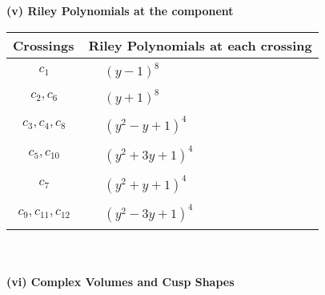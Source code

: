 \documentclass[1p]{elsarticle_modified}
\theoremstyle{definition}
\begin{document}
\newpage\renewcommand{\arraystretch}{1}
\flushleft \textbf{(v) Riley Polynomials at the component}\newline \\
\begin{tabular}{m{50pt}|m{274pt}}
Crossings & \hspace{64pt}Riley Polynomials at each crossing \\
\hline $$\begin{aligned}c_{1}\end{aligned}$$&$\begin{aligned}
&(y-1)^8
\end{aligned}$\\
\hline $$\begin{aligned}c_{2},c_{6}\end{aligned}$$&$\begin{aligned}
&(y+1)^8
\end{aligned}$\\
\hline $$\begin{aligned}c_{3},c_{4},c_{8}\end{aligned}$$&$\begin{aligned}
&(y^2- y+1)^4
\end{aligned}$\\
\hline $$\begin{aligned}c_{5},c_{10}\end{aligned}$$&$\begin{aligned}
&(y^2+3 y+1)^4
\end{aligned}$\\
\hline $$\begin{aligned}c_{7}\end{aligned}$$&$\begin{aligned}
&(y^2+y+1)^4
\end{aligned}$\\
\hline $$\begin{aligned}c_{9},c_{11},c_{12}\end{aligned}$$&$\begin{aligned}
&(y^2-3 y+1)^4
\end{aligned}$\\
\hline
\end{tabular}\\~\\
\newpage\flushleft \textbf{(vi) Complex Volumes and Cusp Shapes}
\end{document}
